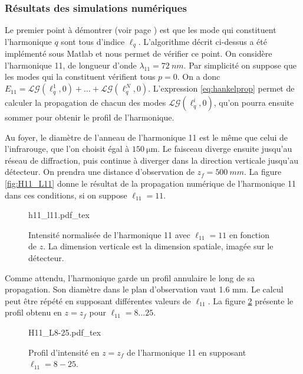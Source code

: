 \subsubsection{Résultats des simulations numériques}

Le premier point à démontrer (voir page \pageref{enum:properties}) est que les mode qui constituent l'harmonique $q$ sont tous d'indice $\ell_q$. L'algorithme décrit ci-dessus a été implémenté sous Matlab et nous permet de vérifier ce point. On considère l'harmonique 11, de longueur d'onde $\lambda_{11}=\SI{72}{nm}$. Par simplicité on suppose que les modes qui la constituent vérifient tous $p=0$. On a donc $E_{11} = \mathcal{LG}(\ell_q^1,0)+\ldots+\mathcal{LG}(\ell_q^N,0)$. L'expression \ref{eq:hankelprop} permet de calculer la propagation de chacun des modes $\mathcal{LG}(\ell_q^i,0)$, qu'on pourra ensuite sommer pour obtenir le profil de l'harmonique. \par
Au foyer, le diamètre de l'anneau de l'harmonique 11 est le même que celui de l'infrarouge, que l'on choisit égal à $\SI{150}{\micro\m}$. Le faisceau diverge ensuite jusqu'au réseau de diffraction, puis continue à diverger dans la direction verticale jusqu'au détecteur. On prendra une distance d'observation de $z_f=\SI{500}{mm}$. La figure \ref{fig:H11_L11} donne le résultat de la propagation numérique de l'harmonique 11 dans ces conditions, si on suppose $\ell_{11}=11$.
\begin{figure}[!ht]
\centering
\def\svgwidth{.5\columnwidth}
{h11_l11.pdf_tex}
\caption{Intensité normalisée de l'harmonique 11 avec $\ell_{11} = 11$ en fonction de $z$. La dimension verticale est la dimension spatiale, imagée sur le détecteur.}
\label{Fig:H11_L11}
\end{figure}
Comme attendu, l'harmonique garde un profil annulaire le long de sa propagation. Son diamètre dans le plan d'observation vaut 1.6 mm. Le calcul peut être répété en supposant différentes valeurs de $\ell_{11}$. La figure \ref{Fig:H11_L8-25} présente le profil obtenu en $z=z_f$ pour $\ell_{11}=8\ldots 25$.

\begin{figure}[!ht]
\centering
\def\svgwidth{.7\columnwidth}
{H11_L8-25.pdf_tex}
\caption{Profil d'intensité en $z=z_f$ de l'harmonique 11 en supposant $\ell_{11} = 8-25$.}
\label{Fig:H11_L8-25}
\end{figure}

